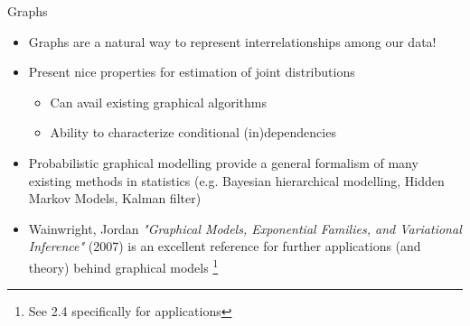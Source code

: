 \documentclass{beamer}
\begin{document}
\begin{frame}{Graphs}
    \begin{itemize}\setlength\itemsep{4mm}
        \item Graphs are a natural way to represent interrelationships among our data! 
        \item Present nice properties for estimation of joint distributions 
        \begin{itemize}
            \item Can avail existing graphical algorithms
            \item Ability to characterize conditional (in)dependencies
        \end{itemize}
        \item Probabilistic graphical modelling provide a general formalism of many existing methods in statistics (e.g. Bayesian hierarchical modelling, Hidden Markov Models, Kalman filter)
        \item Wainwright, Jordan {\it "Graphical Models, Exponential Families, and Variational Inference"} (2007) is an excellent reference for further applications (and theory) behind graphical models \cite{wainwright_graphical_2007}\footnote{See 2.4 specifically for applications}
    \end{itemize}
\end{frame}
\end{document}
